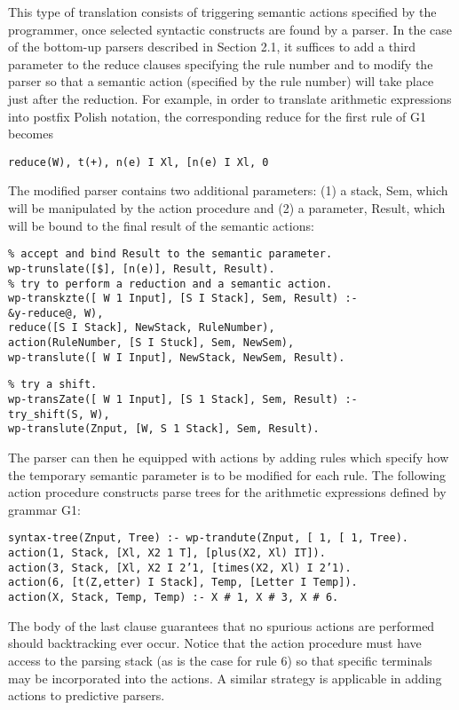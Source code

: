 \label{cohen3}

This type of translation consists of triggering semantic actions specified by the
programmer, once selected syntactic constructs are found by a parser. In the case
of the bottom-up parsers described in Section 2.1, it suffices to add a third
parameter to the reduce clauses specifying the rule number and to modify the
parser so that a semantic action (specified by the rule number) will take place
just after the reduction. For example, in order to translate arithmetic expressions
into postfix Polish notation, the corresponding reduce for the first rule of G1
becomes
\begin{verbatim}
reduce(W), t(+), n(e) I Xl, [n(e) I Xl, 0
\end{verbatim}
The modified parser contains two additional parameters: (1) a stack, Sem, which
will be manipulated by the action procedure and (2) a parameter, Result, which
will be bound to the final result of the semantic actions:
\begin{verbatim}
% accept and bind Result to the semantic parameter.
wp-trunslate([$], [n(e)], Result, Result).
% try to perform a reduction and a semantic action.
wp-transkzte([ W 1 Input], [S I Stack], Sem, Result) :-
&y-reduce@, W),
reduce([S I Stack], NewStack, RuleNumber),
action(RuleNumber, [S I Stuck], Sem, NewSem),
wp-translute([ W I Input], NewStack, NewSem, Result). 
\end{verbatim}
\begin{verbatim}
% try a shift.
wp-transZate([ W 1 Input], [S 1 Stack], Sem, Result) :-
try_shift(S, W),
wp-translute(Znput, [W, S 1 Stack], Sem, Result).  
\end{verbatim}
The parser can then he equipped with actions by adding rules which specify how
the temporary semantic parameter is to be modified for each rule. The following
action procedure constructs parse trees for the arithmetic expressions defined by
grammar G1:
\begin{verbatim}
syntax-tree(Znput, Tree) :- wp-trandute(Znput, [ 1, [ 1, Tree).
action(1, Stack, [Xl, X2 1 T], [plus(X2, Xl) IT]).
action(3, Stack, [Xl, X2 I 2’1, [times(X2, Xl) I 2’1).
action(6, [t(Z,etter) I Stack], Temp, [Letter I Temp]).
action(X, Stack, Temp, Temp) :- X # 1, X # 3, X # 6. 
\end{verbatim}
The body of the last clause guarantees that no spurious actions are performed
should backtracking ever occur. Notice that the action procedure must have
access to the parsing stack (as is the case for rule 6) so that specific terminals
may be incorporated into the actions. A similar strategy is applicable in adding
actions to predictive parsers. 


